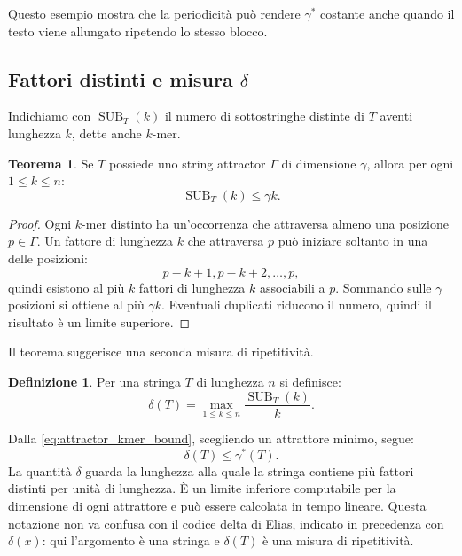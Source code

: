 \documentclass{article}
\theoremstyle{definition}
\newtheorem{theorem}{Teorema}[section] %
\newtheorem{definizione}{Definizione}[section]
\numberwithin{equation}{section}
\begin{document}
Questo esempio mostra che la periodicità può rendere $\gamma^*$ costante anche
quando il testo viene allungato ripetendo lo stesso blocco.

\subsection{Fattori distinti e misura \texorpdfstring{$\delta$}{delta}}
Indichiamo con $\operatorname{SUB}_T(k)$ il numero di sottostringhe distinte di
$T$ aventi lunghezza $k$, dette anche $k$-mer.

\begin{theorem}\label{theorem_attractor_distinct_kmers}
    Se $T$ possiede uno string attractor $\Gamma$ di dimensione $\gamma$, allora
    per ogni $1\leq k\leq n$:
    \begin{equation}\label{eq:attractor_kmer_bound}
        \operatorname{SUB}_T(k)\leq \gamma k.
    \end{equation}
\end{theorem}

\begin{proof}
    Ogni $k$-mer distinto ha un'occorrenza che attraversa almeno una posizione
    $p\in\Gamma$. Un fattore di lunghezza $k$ che attraversa $p$ può iniziare
    soltanto in una delle posizioni:
    \[
        p-k+1,p-k+2,\ldots,p,
    \]
    quindi esistono al più $k$ fattori di lunghezza $k$ associabili a $p$.
    Sommando sulle $\gamma$ posizioni si ottiene al più $\gamma k$. Eventuali
    duplicati riducono il numero, quindi il risultato è un limite superiore.
\end{proof}

Il teorema suggerisce una seconda misura di ripetitività.

\begin{definizione}
    Per una stringa $T$ di lunghezza $n$ si definisce:
    \begin{equation}\label{eq:delta_repetitiveness}
        \delta(T)
        =
        \max_{1\leq k\leq n}
        \frac{\operatorname{SUB}_T(k)}{k}.
    \end{equation}
\end{definizione}

Dalla \eqref{eq:attractor_kmer_bound}, scegliendo un attrattore minimo, segue:
\begin{equation}\label{eq:delta_attractor_relation}
    \delta(T)\leq\gamma^*(T).
\end{equation}
La quantità $\delta$ guarda la lunghezza alla quale la stringa contiene più
fattori distinti per unità di lunghezza. È un limite inferiore computabile per
la dimensione di ogni attrattore e può essere calcolata in tempo lineare.
Questa notazione non va confusa con il codice delta di Elias, indicato in
precedenza con $\delta(x)$: qui l'argomento è una stringa e $\delta(T)$ è una
misura di ripetitività.
\end{document}

